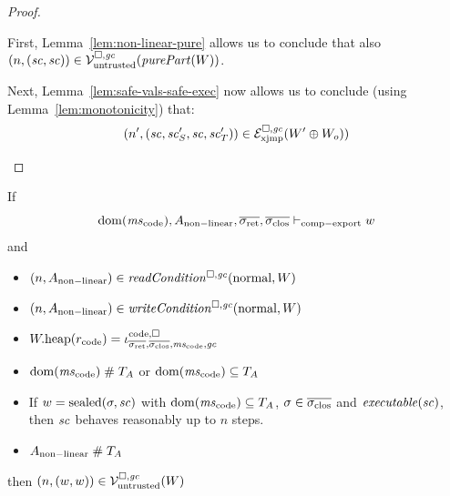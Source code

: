 \documentclass[a4paper]{article}
\begin{document}
\begin{proof}
\begin{itemize}
\begin{itemize}
     First, Lemma~\ref{lem:non-linear-pure} allows us to conclude that also $\npair{(\vsc,\vsc)} \in \lrv (\purePart{W})$.

     Next, Lemma~\ref{lem:safe-vals-safe-exec} now allows us to conclude (using Lemma~\ref{lem:monotonicity}) that:
     \begin{equation*}
       \npair[n']{(\vsc,\vsc_S',\vsc,\vsc_T')} \in \lrexj(W'\oplus W_o))
     \end{equation*}
    \end{itemize}
  \end{itemize}
\end{proof}

\begin{lemma}
  \label{lem:ftlr-comp-export}
  If
  \begin{equation*}
    \dom(\mscode), A_{\mathrm{non-linear}}, \sigrets,\sigcloss \vdash_{\mathrm{comp-export}} w
  \end{equation*}
  and
  \begin{itemize}
  \item $\npair{A_{\mathrm{non-linear}}} \in \readCond{\normal,W}$
  \item $\npair{A_{\mathrm{non-linear}}} \in \writeCond{\normal,W}$
  \item $\pwheap(r_{\mathrm{code}}) = \codereg{\sigrets,\sigcloss,\mscode,\gc}$
  \item $\dom(\mscode) \mathrel{\#} \ta$ or $\dom(\mscode) \subseteq \ta$
  \item If $w = \sealed{\sigma,\vsc}$ with $\dom(\mscode) \subseteq \ta$, $\sigma \in \sigcloss$ and $\exec{\vsc}$, then
    $\vsc$ behaves reasonably up to $n$ steps.
  \item $A_{\mathrm{non-linear}}\mathrel{\#} \ta$
  \end{itemize}

  then $\npair{(w,w)} \in \lrv(W)$
\end{lemma}
\end{document}
